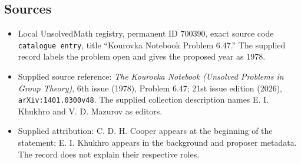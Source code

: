 \documentclass[11pt]{article}
\begin{document}
\subsection{Sources}
\begin{itemize}
\item Local UnsolvedMath registry, permanent ID \(700390\), exact source code \texttt{catalogue entry}, title ``Kourovka Notebook Problem 6.47.'' The supplied record labels the problem open and gives the proposed year as 1978.
\item Supplied source reference: \emph{The Kourovka Notebook (Unsolved Problems in Group Theory)}, 6th issue (1978), Problem 6.47; 21st issue edition (2026), \texttt{arXiv:1401.0300v48}. The supplied collection description names E. I. Khukhro and V. D. Mazurov as editors.
\item Supplied attribution: C. D. H. Cooper appears at the beginning of the statement; E. I. Khukhro appears in the background and proposer metadata. The record does not explain their respective roles.
\end{itemize}
\end{document}
